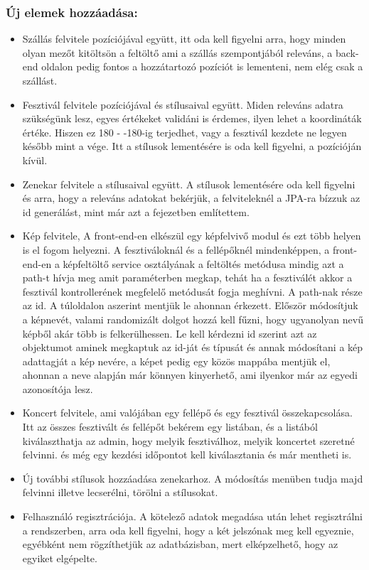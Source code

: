 \subsubsection{Új elemek hozzáadása:}
\begin{itemize}
\item Szállás felvitele pozíciójával együtt, itt oda kell figyelni arra, hogy minden olyan mezőt kitöltsön a feltöltő ami a szállás szempontjából releváns, a back-end oldalon pedig fontos a hozzátartozó pozíciót is lementeni, nem elég csak a szállást.

\item Fesztivál felvitele pozíciójával és stílusaival együtt. Miden releváns adatra szükségünk lesz, egyes értékeket validáni is érdemes, ilyen lehet a koordináták értéke. Hiszen ez 180 - -180-ig terjedhet, vagy a fesztivál kezdete ne legyen később mint a vége. Itt a stílusok lementésére is oda kell figyelni, a pozícióján kívül.

\item Zenekar felvitele a stílusaival együtt. A stílusok lementésére oda kell figyelni és arra, hogy a releváns adatokat bekérjük, a felviteleknél a JPA-ra bízzuk az id generálást, mint már azt a fejezetben említettem.

\item Kép felvitele, A front-end-en elkészül egy képfelvivő modul és ezt több helyen is el fogom helyezni. A fesztiváloknál és a fellépőknél mindenképpen, a front-end-en a képfeltöltő service osztályának a feltöltés metódusa mindig azt a path-t hívja meg amit paraméterben megkap, tehát ha a fesztiválét akkor a fesztivál kontrollerének megfelelő metódusát fogja meghívni. A path-nak része az id. A túloldalon aszerint mentjük le ahonnan érkezett. Először módosítjuk a képnevét, valami randomizált dolgot hozzá kell fűzni, hogy ugyanolyan nevű képből akár több is felkerülhessen. Le kell kérdezni id szerint azt az objektumot aminek megkaptuk az id-ját és típusát és annak módosítani a kép adattagját a kép nevére, a képet pedig egy közös mappába mentjük el, ahonnan a neve alapján már könnyen kinyerhető, ami ilyenkor már az egyedi azonosítója lesz.

\item Koncert felvitele, ami valójában egy fellépő és egy fesztivál összekapcsolása. Itt az összes fesztivált és fellépőt bekérem egy listában, és a listából kiválaszthatja az admin, hogy melyik fesztiválhoz, melyik koncertet szeretné felvinni. és még egy kezdési időpontot kell kiválasztania és már mentheti is.

\item Új további stílusok hozzáadása zenekarhoz. A módosítás menüben tudja majd felvinni illetve lecserélni, törölni a stílusokat.

\item Felhasználó regisztrációja. A kötelező adatok megadása után lehet regisztrálni a rendszerben, arra oda kell figyelni, hogy a két jelszónak meg kell egyeznie, egyébként nem rögzíthetjük az adatbázisban, mert elképzelhető, hogy az egyiket elgépelte.
\end{itemize}

